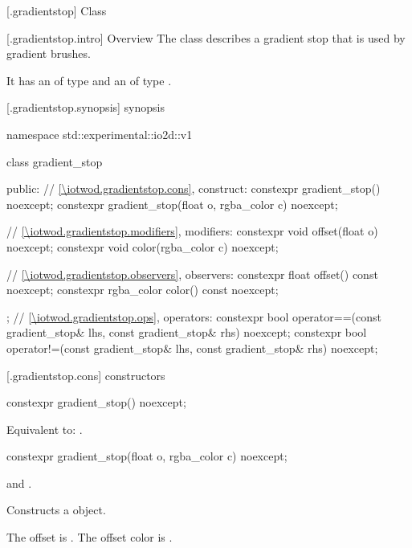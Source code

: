  [\iotwod.gradientstop] {Class }

 [\iotwod.gradientstop.intro] {Overview}
\pnum
{}%
The class  describes a gradient stop that is used by gradient brushes.

\pnum
It has an  of type  and an  of type .

 [\iotwod.gradientstop.synopsis] { synopsis}

\begin{codeblock}
namespace std::experimental::io2d::v1 {
  class gradient_stop {
  public:
    // \ref{\iotwod.gradientstop.cons}, construct:
    constexpr gradient_stop() noexcept;
    constexpr gradient_stop(float o, rgba_color c) noexcept;
    
    // \ref{\iotwod.gradientstop.modifiers}, modifiers:
    constexpr void offset(float o) noexcept;
    constexpr void color(rgba_color c) noexcept;
	
    // \ref{\iotwod.gradientstop.observers}, observers:
    constexpr float offset() const noexcept;
    constexpr rgba_color color() const noexcept;
  };
  // \ref{\iotwod.gradientstop.ops}, operators:
  constexpr bool operator==(const gradient_stop& lhs, const gradient_stop& rhs)
    noexcept;
  constexpr bool operator!=(const gradient_stop& lhs, const gradient_stop& rhs)
    noexcept;
}
\end{codeblock}

 [\iotwod.gradientstop.cons] { constructors}

%
\begin{itemdecl}
constexpr gradient_stop() noexcept;
\end{itemdecl}
\begin{itemdescr}
\pnum
\effects
Equivalent to: .
\end{itemdescr}

%
\begin{itemdecl}
constexpr gradient_stop(float o, rgba_color c) noexcept;
\end{itemdecl}
\begin{itemdescr}
\pnum
\requires
{} and .

\pnum
\effects
Constructs a  object.

\pnum
The offset is . The offset color is .
\end{itemdescr}

